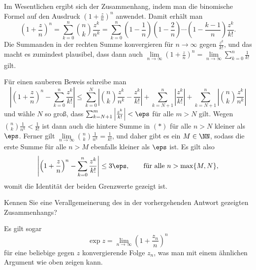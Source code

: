 \begin{antwort}
  Im Wesentlichen ergibt sich der Zusammenhang, 
  indem man die binomische Formel auf den Ausdruck 
  $\left( 1+\frac{z}{n} \right)^n$ anwendet. Damit erhält man
  \[
  \left( 1+\frac{z}{n} \right )^n = 
  \sum_{k=0}^n \binom{n}{k} \frac{z^k}{n^k} = 
  \sum_{k=0}^n 
  \left(1-\frac{1}{n}\right) \left(1-\frac{2}{n}\right) \cdots
  \left(1-\frac{k-1}{n}\right) \frac{z^k}{k!}.
  \]
  Die Summanden in der rechten Summe 
  konvergieren für $n\to\infty$ gegen $\frac{z^k}{k!}$, 
  und das macht es zumindest plausibel, dass dann auch 
  $\lim\limits_{n\to\infty} \left( 1+\frac{z}{n} \right)^n= 
  \lim\limits_{n\to\infty}\sum_{k=0}^n\frac{1}{k!}$ gilt.  
  
  Für einen sauberen Beweis schreibe man 
  \begin{equation}
    \left| \left( 1+\frac{z}{n} \right)^n 
      -\sum_{k=0}^n \frac{z^k}{k!} \right| 
    \le 
    \sum_{k=0}^N \left| \binom{n}{k} \frac{z^k}{n^k} - \frac{z^k}{k!} \right|
    + 
    \sum_{k=N+1}^n \left| \frac{z^k}{k!} \right| +
    \sum_{k=N+1}^n \left|\binom{n}{k} \frac{z^k}{n^k} \right|
    \tag{$\ast$}
  \end{equation}
  und wähle $N$ so groß, dass 
  $\sum_{k=N+1}^m \left| \frac{z^k}{k!} \right| < \eps$ für alle $m>N$ 
  gilt. Wegen $\binom{n}{k} \frac{1}{n^k} < \frac{1}{k!}$   
  ist dann auch die hintere Summe in $(\ast)$ für alle 
  $n>N$ kleiner als $\eps$. Ferner gilt 
  $\lim\limits_{n\to\infty}\binom{n}{k} \frac{1}{n^k} = \frac{1}{k!}$, 
  und daher gibt es ein $M\in \NN$, sodass die erste Summe 
  für alle $n>M$ ebenfalls kleiner als $\eps$ ist. Es gilt also 
  \[
  \left| \left( 1+\frac{z}{n} \right)^n 
    -\sum_{k=0}^n \frac{z^k}{k!} \right| 
  \le 3\eps,\qquad\text{für alle $n>\max\{M,N\}$},
  \] 
  womit die Identität der beiden Grenzwerte gezeigt ist. \AntEnd
\end{antwort}

\begin{frage}\label{05_verallg}
  Kennen Sie eine Verallgemeinerung des 
  in der vorhergehenden Antwort gezeigten Zusammenhangs?
\end{frage}

\begin{antwort}
  Es gilt sogar 
  \[ \exp z = \lim_{n\to\infty} \left( 1+\frac{z_n}{n} \right)^n \]
  für eine beliebige gegen $z$ konvergierende Folge $z_n$,   
  was man mit einem ähnlichen Argument wie oben zeigen kann. \AntEnd
\end{antwort}

